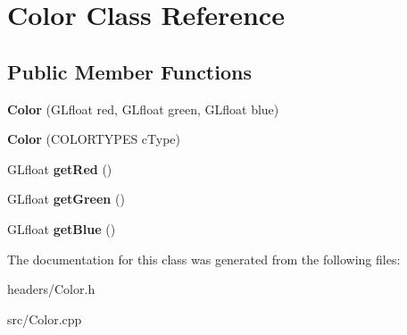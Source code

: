 \hypertarget{class_color}{\section{Color Class Reference}
\label{class_color}
}
\subsection*{Public Member Functions}
\begin{DoxyCompactItemize}
\item 
\hypertarget{class_color_a97943f89fb6aeae83a133b5b9cf52b01}{{\bfseries Color} (G\+Lfloat red, G\+Lfloat green, G\+Lfloat blue)}\label{class_color_a97943f89fb6aeae83a133b5b9cf52b01}

\item 
\hypertarget{class_color_a389aef424a1de63c5523ce588d8bb4b6}{{\bfseries Color} (C\+O\+L\+O\+R\+T\+Y\+P\+E\+S c\+Type)}\label{class_color_a389aef424a1de63c5523ce588d8bb4b6}

\item 
\hypertarget{class_color_afcaa36caffdf50c04d2a29b9c1878904}{G\+Lfloat {\bfseries get\+Red} ()}\label{class_color_afcaa36caffdf50c04d2a29b9c1878904}

\item 
\hypertarget{class_color_a56d96d8430cebde9eb51efdc1de02083}{G\+Lfloat {\bfseries get\+Green} ()}\label{class_color_a56d96d8430cebde9eb51efdc1de02083}

\item 
\hypertarget{class_color_a188b2135af377105ca30b375182cb8ad}{G\+Lfloat {\bfseries get\+Blue} ()}\label{class_color_a188b2135af377105ca30b375182cb8ad}

\end{DoxyCompactItemize}


The documentation for this class was generated from the following files\+:\begin{DoxyCompactItemize}
\item 
headers/Color.\+h\item 
src/Color.\+cpp\end{DoxyCompactItemize}
